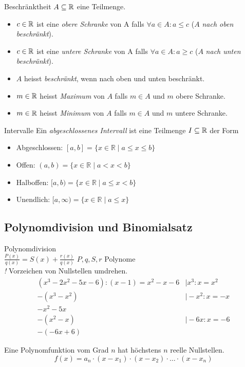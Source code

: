 \begin{definition}{Beschränktheit}
    $A \subseteq \mathbb{R}$ eine Teilmenge.
    \begin{itemize}
        \item $c \in \mathbb{R}$ ist eine \emph{obere Schranke} von A falls $\forall a \in A: a\leq c$ ($A$ \textit{nach oben beschränkt}).
        \item $c \in \mathbb{R}$ ist eine \emph{untere Schranke} von A falls $\forall a \in A: a \geq c$ ($A$ \textit{nach unten beschränkt}).
        \item $A$ heisst \textit{beschränkt}, wenn nach oben und unten beschränkt.
        \item $m \in \mathbb{R}$ heisst \emph{Maximum} von $A$ falls $m \in A$ und $m$ obere Schranke.
        \item $m \in \mathbb{R}$ heisst \emph{Minimum} von $A$ falls $m \in A$ und $m$ untere Schranke.
    \end{itemize}
\end{definition}

\begin{definition}{Intervalle}
    Ein \emph{abgeschlossenes Intervall} ist eine Teilmenge $I \subseteq \mathbb{R}$ der Form
    \begin{itemize}
        \item Abgeschlossen:
            $[a, b]=\{x \in \mathbb{R} \mid a \leq x \leq b\}$
        \item Offen:
            $(a, b)=\{x \in \mathbb{R} \mid a<x<b\}$
        \item Halboffen:
            $[a, b)=\{x \in \mathbb{R} \mid a \leq x<b\}$
        \item Unendlich:
            $[a, \infty)=\{x \in \mathbb{R} \mid a \leq x\}$
    \end{itemize}
\end{definition}

\subsection{Polynomdivision und Binomialsatz}

\begin{KR}{Polynomdivision}\\
    $\frac{P(x)}{q(x)} = S(x) + \frac{r(x)}{q(x)}$ \qquad $P,q,S,r$ Polynome\\
\emph{!} Vorzeichen von Nullstellen umdrehen.
\tcblower
$$
\begin{array}{cc}
\left(x^3-2 x^2-5 x-6\right):(x-1)=x^2-x-6 & \mid x^3: x=x^2 \\
-\left(x^3-x^2\right) & \mid-x^2: x=-x \\
-x^2-5 x & \\
-\left(x^2-x\right) & \mid-6 x: x=-6 \\
\hline-(-6 x+6) &
\end{array}
$$

Eine Polynomfunktion vom Grad $n$ hat höchstens $n$ reelle Nullstellen.
$$
f(x)=a_n \cdot\left(x-x_1\right) \cdot\left(x-x_2\right) \cdot \ldots \cdot\left(x-x_n\right)
$$
\end{KR}

